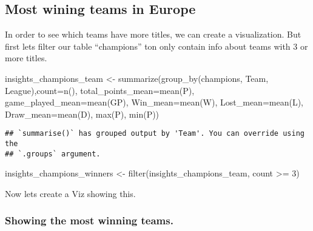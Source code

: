 \documentclass[
]{article}
\newenvironment{Shaded}{\begin{snugshade}}{\end{snugshade}}
\newcommand{\AttributeTok}[1]{\textcolor[rgb]{0.77,0.63,0.00}{#1}}
\newcommand{\DecValTok}[1]{\textcolor[rgb]{0.00,0.00,0.81}{#1}}
\newcommand{\FunctionTok}[1]{\textcolor[rgb]{0.00,0.00,0.00}{#1}}
\newcommand{\NormalTok}[1]{#1}
\newcommand{\OtherTok}[1]{\textcolor[rgb]{0.56,0.35,0.01}{#1}}
\newcommand{\SpecialCharTok}[1]{\textcolor[rgb]{0.00,0.00,0.00}{#1}}
\begin{document}
\hypertarget{most-wining-teams-in-europe}{%
\subsection{Most wining teams in
Europe}\label{most-wining-teams-in-europe}}

In order to see which teams have more titles, we can create a
visualization. But first lets filter our table ``champions'' ton only
contain info about teams with 3 or more titles.

\begin{Shaded}
\begin{Highlighting}[]
\NormalTok{insights\_champions\_team }\OtherTok{\textless{}{-}} \FunctionTok{summarize}\NormalTok{(}\FunctionTok{group\_by}\NormalTok{(champions, Team, League),}\AttributeTok{count=}\FunctionTok{n}\NormalTok{(), }\AttributeTok{total\_points\_mean=}\FunctionTok{mean}\NormalTok{(P), }\AttributeTok{game\_played\_mean=}\FunctionTok{mean}\NormalTok{(GP), }
                                \AttributeTok{Win\_mean=}\FunctionTok{mean}\NormalTok{(W), }\AttributeTok{Lost\_mean=}\FunctionTok{mean}\NormalTok{(L), }\AttributeTok{Draw\_mean=}\FunctionTok{mean}\NormalTok{(D), }\FunctionTok{max}\NormalTok{(P), }\FunctionTok{min}\NormalTok{(P))}
\end{Highlighting}
\end{Shaded}

\begin{verbatim}
## `summarise()` has grouped output by 'Team'. You can override using the
## `.groups` argument.
\end{verbatim}

\begin{Shaded}
\begin{Highlighting}[]
\NormalTok{insights\_champions\_winners }\OtherTok{\textless{}{-}} \FunctionTok{filter}\NormalTok{(insights\_champions\_team, count }\SpecialCharTok{\textgreater{}=} \DecValTok{3}\NormalTok{)}
\end{Highlighting}
\end{Shaded}

Now lets create a Viz showing this.

\hypertarget{showing-the-most-winning-teams.}{%
\subsubsection{Showing the most winning
teams.}\label{showing-the-most-winning-teams.}}
\end{document}
